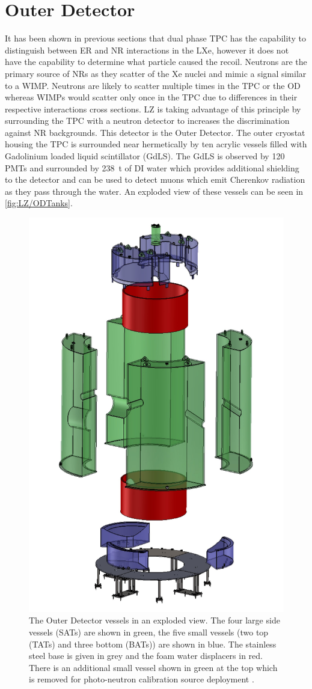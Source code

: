 \section{Outer Detector}\label{sec:LZ/LZOD}
It has been shown in previous sections that dual phase TPC has the capability to distinguish between ER and NR interactions in the LXe, however it does not have the capability to determine what particle caused the recoil. Neutrons are the primary source of NRs as they scatter of the Xe nuclei and mimic a signal similar to a WIMP. Neutrons are likely to scatter multiple times in the TPC or the OD whereas WIMPs would scatter only once in the TPC due to differences in their respective interactions cross sections. LZ is taking advantage of this principle by surrounding the TPC with a neutron detector to increases the discrimination against NR backgrounds. This detector is the Outer Detector.
The outer cryostat housing the TPC is surrounded near hermetically by ten acrylic vessels filled with  Gadolinium loaded liquid scintillator (GdLS). The GdLS is observed by 120 PMTs and surrounded by 238~t of DI water which provides additional shielding to the detector and can be used to detect muons which emit Cherenkov radiation as they pass through the water. An exploded view of these vessels can be seen in \autoref{fig:LZ/ODTanks}.
\begin{figure}[!ht]
    \centering
    \includegraphics[width=0.5\linewidth]{figures/LZ/CAD_ODTanks.jpg}
    \caption{The Outer Detector vessels in an exploded view. The four large side vessels (SATs) are shown in green, the five small vessels (two top (TATs) and three bottom (BATs)) are shown in blue. The stainless steel base is given in grey and the foam water displacers in red. There is an additional small vessel shown in green at the top which is removed for photo-neutron calibration source deployment \cite{LZNIMA}.}
    \label{fig:LZ/ODTanks}
\end{figure}

